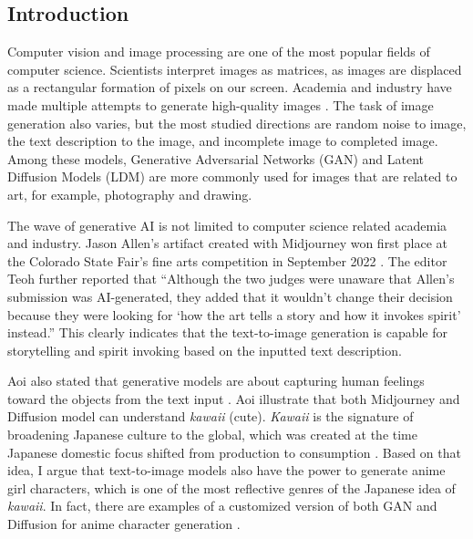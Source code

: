 \subsection*{Introduction}
\par
Computer vision and image processing are one of the most popular fields of computer science. 
Scientists interpret images as matrices, as images are displaced as a rectangular formation of pixels on our screen.
Academia and industry have made multiple attempts to generate high-quality images
\cite{
    pmlr-v37-gregor15, 
    Qiao_2019_CVPR, 
    NEURIPS2019_1d72310e, 
    NIPS2016_b1301141,
    Goodfellow2020Generative,
    Rombach2022High,
    He_2022_CVPR,
}.
The task of image generation also varies,
but the most studied directions are 
random noise to image,
the text description to the image,
and incomplete image to completed image.
Among these models, Generative Adversarial Networks (GAN) \cite{Goodfellow2020Generative} and Latent Diffusion Models (LDM) \cite{Rombach2022High} are more commonly used for images that are related to art, for example, photography and drawing.

\par
The wave of generative AI is not limited to computer science related academia and industry. 
Jason Allen's artifact created with Midjourney\cite{Midjourney} won first place at the Colorado State Fair's fine arts competition in September 2022 \cite{Teoh2022Art}.
The editor Teoh \cites{Teoh2022Art} further reported that 
``Although the two judges were unaware that Allen's submission was AI-generated, they added that it wouldn't change their decision because they were looking for `how the art tells a story and how it invokes spirit' instead.''
This clearly indicates that the text-to-image generation is capable for storytelling and spirit invoking based on the inputted text description.

\par
Aoi also stated that generative models are about capturing human feelings toward the objects from the text input \cite{Aoi2022Stable}.
Aoi illustrate that both Midjourney and Diffusion model can understand
{\it kawaii} (cute).
{\it Kawaii} is the signature of broadening Japanese culture to the global,
which was created at the time Japanese domestic focus shifted from production to consumption \cite{Yano2013Pink}.
Based on that idea,
I argue that text-to-image models also have the power to generate anime girl characters,
which is one of the most reflective genres of the Japanese idea of {\it kawaii}.
In fact, there are examples of a customized version of both GAN and Diffusion for anime character generation
\cite{
    Jin2017Towards,
    Ruan2022Anime,
    WaifuDiffusion,
    nizan2020council,
    chong2021gans,
    chong2021jojogan,
}.